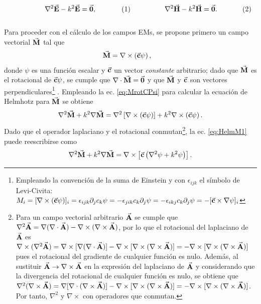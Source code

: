 \documentclass[letterpaper,11pt] {article}
\newcommand{\beqhalf}{\noindent \begin{minipage}[c]{.5\linewidth} \begin{equation}}
\newcommand{\eeqhalf}{\end{equation} \end{minipage} }
\newcommand{\eqhalf}[1]{\beqhalf #1 \eeqhalf}
\begin{document}
	\begin{subequations}
	\eqhalf{\nabla^2 \va{E}- k^2 \va{E} = \va{0},}
	\eqhalf{\nabla^2 \va{H}- k^2 \va{H} = \va{0}.}
	\label{eq:Helmholtz}
	\end{subequations}\\
Para proceder con el cálculo de los campos EMs, se propone primero un campo vectorial $\va{M}$ tal que
	\begin{align}
	\va{M} &= \nabla \times \left(\va{c} \psi\right),
	\label{eq:MrotCPsi}
	\end{align}
donde $\psi$ es una función escalar y $\va{c}$ un vector \emph{constante} arbitrario; dado que $\va{M}$ es el rotacional de  $\va{c}\psi$, se cumple que $\nabla\cdot \va{M} = \va{0}$ y que $\va{M}$ y $\va{c}$ son vectores perpendiculares\footnote{Empleando la convención de la suma de Einstein y con $\epsilon_{ijk}$ el símbolo de  Levi-Civita: $M_i = [\nabla\times(\va{c}\psi)]_i =  \epsilon_{ijk}\partial_jc_k\psi = -\epsilon_{jik}c_k\partial_j\psi = -\epsilon_{ikj}c_k\partial_j\psi  = - [\va{c}\times\nabla\psi]_i$} . Empleando la ec. \eqref{eq:MrotCPsi} para calcular la ecuación de Helmhotz para $\va{M}$ se obtiene
	\begin{equation}
	\nabla^2 \va{M} + k^2 \nabla\va{M} = \nabla^2 \left[ \nabla\times\left(\va{c} \psi\right) \right]+ 
			k^2 \nabla \times \left(\va{c} \psi\right).\label{eq:HelmM1}
	\end{equation}
Dado que el operador laplaciano y el rotacional conmutan\footnote{ Para un campo vectorial arbitrario $\va{A}$ se cumple que $\nabla^2\va{A} = \nabla(\nabla\cdot\va{A}) - \nabla\times(\nabla\times\va{A})$, por lo que el rotacional del laplaciano de $\va{A}$ es $ \nabla\times( \nabla^2\va{A})=\nabla\times[\nabla(\nabla\cdot\va{A})  ]-  \nabla\times[\nabla\times(\nabla\times \va{A})] = -  \nabla\times[\nabla\times(\nabla\times \va{A})] $ pues el rotacional del gradiente de cualquier función es nulo. Además, al sustituir $\va{A}\to \nabla\times\va{A}$ en la expresión del laplaciano de $\va{A}$ y  considerando que la divergencia del rotacional de cualquier función es nulo, se obtiene que$ \nabla^2(\nabla\times\va{A})=\nabla[\nabla\cdot(\nabla\times\va{A})  ]-  \nabla\times[\nabla\times(\nabla\times \va{A})] = -  \nabla\times[\nabla\times(\nabla\times \va{A})] $. Por tanto, $\nabla^2$ y $\nabla\times$ con operadores que conmutan.}, la ec. \eqref{eq:HelmM1} puede reescribirse como
	\begin{equation}
	\nabla^2 \va{M} + k^2 \nabla\va{M}  = \nabla\times\left[\va{c}\left( \nabla^2\psi+k^2\psi \right) \right].
	\end{equation}
	
\end{document}
